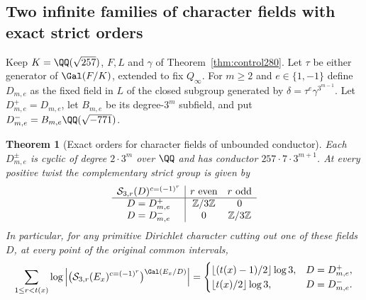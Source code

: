 \documentclass[a4paper,11pt]{article}
\newtheorem{theorem}[proposition]{Theorem}
\theoremstyle{definition}
\theoremstyle{remark}
\newcommand{\ZZ}{\mathbb Z}\newcommand{\ord}{\operatorname{ord}}
\numberwithin{equation}{section}
\begin{document}
\subsection{Two infinite families of character fields with exact strict orders}\label{nav:I-64}
Keep \(K=\QQ(\sqrt{257})\), \(F,L\) and \(\gamma\) of
Theorem~\ref{thm:control280}. Let \(\tau\) be either generator
of \(\Gal(F/K)\), extended to fix \(Q_\infty\). For
\(m\ge2\) and \(e\in\{1,-1\}\) define \(D_{m,e}\) as the
fixed field in \(L\) of the closed subgroup generated by
\(\delta=\tau^e\gamma^{3^{m-1}}\).
Let \(D_{m,e}^+=D_{m,e}\), let \(B_{m,e}\) be its degree-\(3^m\)
subfield, and put \(D_{m,e}^-=B_{m,e}\QQ(\sqrt{-771})\).

\begin{theorem}[Exact orders for character fields of unbounded conductor]\leavevmode
\label{thm:fields280}
Each \(D_{m,e}^{\pm}\) is cyclic of degree \(2\cdot3^m\)
over \(\QQ\) and has conductor \(257\cdot7\cdot3^{m+1}\).
At every positive twist the complementary strict group is
given by
\[
 \begin{array}{c|cc}
 \mathcal S_{3,r}(D)^{c=(-1)^r}&r\ {\rm even}&r\ {\rm odd}\\ \hline
 D=D_{m,e}^+&\ZZ/3\ZZ&0\\
 D=D_{m,e}^-&0&\ZZ/3\ZZ
 \end{array}
\]
In particular, for any primitive Dirichlet character cutting
out one of these fields \(D\), at every point of the original
common intervals,
\[
     \sum_{1\le r<t(x)}
       \log\left|
       \bigl(\mathcal S_{3,r}(E_x)^{c=(-1)^r}\bigr)^{\Gal(E_x/D)}
       \right|
   =
   \begin{cases}
   \lfloor(t(x)-1)/2\rfloor\log3,&D=D_{m,e}^+,\\
   \lfloor t(x)/2\rfloor\log3,&D=D_{m,e}^- .
   \end{cases}
\]
\end{theorem}
\end{document}
